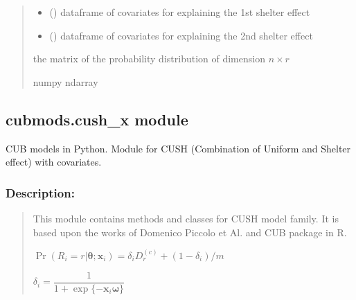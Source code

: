 \documentclass[letterpaper,10pt,english]{sphinxmanual}
\begin{document}
\begin{fulllineitems}
\begin{quote}
\begin{description}
\begin{itemize}
\item {} 
\sphinxAtStartPar
{} () \textendash{} dataframe of covariates for explaining the 1st shelter effect

\item {} 
\sphinxAtStartPar
{} () \textendash{} dataframe of covariates for explaining the 2nd shelter effect

\end{itemize}

\sphinxAtStartPar
the matrix of the probability distribution of dimension \(n \times r\)

\sphinxAtStartPar
numpy ndarray

\end{description}\end{quote}

\end{fulllineitems}



\subsection{cubmods.cush\_x module}
\label{\detokenize{cubmods:module-cubmods.cush_x}}\label{\detokenize{cubmods:cubmods-cush-x-module}}\label{\detokenize{cubmods:cushx-module}}
\sphinxAtStartPar
CUB models in Python.
Module for CUSH (Combination of Uniform
and Shelter effect) with covariates.


\subsubsection{Description:}
\label{\detokenize{cubmods:id591}}\begin{quote}

\sphinxAtStartPar
This module contains methods and classes
for CUSH model family.
It is based upon the works of Domenico
Piccolo et Al. and CUB package in R.

\sphinxAtStartPar
\(\Pr(R_i=r|\pmb \theta; \pmb x_i) = \delta_i D_{r}^{(c)} + (1 - \delta_i)/m\)

\sphinxAtStartPar
\(\delta_i = \dfrac{1}{1+\exp\{ - \pmb x_i \pmb \omega \}}\)
\end{quote}
\end{document}
